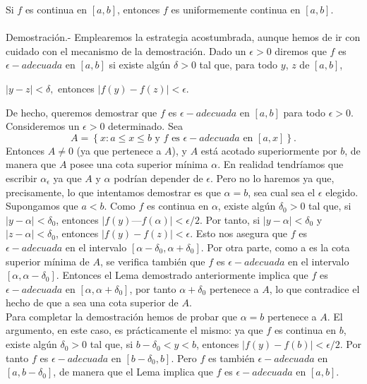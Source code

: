 \begin{teo}
    Si $f$ es continua en $[a,b]$, entonces $f$ es uniformemente continua en $[a,b]$.\\\\
	Demostración.-\; Emplearemos la estrategia acostumbrada, aunque hemos de ir con cuidado con el mecanismo de la demostración. Dado un $\epsilon>0$ diremos que $f$ es $\epsilon-adecuada$ en $[a,b]$ si existe algún $\delta>0$ tal que, para todo $y$,  $z$ de $[a,b]$,
	\begin{center}
	    $|y-z|<\delta,$ entonces $|f(y)-f(z)|<\epsilon.$
	\end{center}
	De hecho, queremos demostrar que $f$ es $\epsilon-adecuada$ en $[a,b]$ para todo $\epsilon>0.$\\
	Consideremos un $\epsilon>0$ determinado. Sea
	$$A=\left\{x:a\leq x \leq b \mbox{ y } f \mbox{ es } \epsilon-adecuada \mbox{ en } [a,x]\right\}.$$
	Entonces $A\neq 0$ (ya que pertenece a $A$), y $A$ está acotado superiormente por $b$, de manera que $A$ posee una cota superior mínima $\alpha$. En realidad tendríamos que escribir $\alpha_\epsilon$ ya que $A$ y $\alpha$ podrían depender de $\epsilon$. Pero no lo haremos ya que, precisamente, lo que intentamos demostrar es que $\alpha=b$, sea cual sea el $\epsilon$ elegido.\\
	Supongamos que $a < b$. Como $f$ es continua en $\alpha$, existe algún $\delta_0 > 0$ tal que, si $|y - \alpha| < \delta_0$, entonces $|f(y) — f(\alpha)| < \epsilon/2$. Por tanto, si $|y - \alpha| < \delta_0$ y $|z - \alpha| < \delta_0$, entonces $|f(y) - f(z)| < \epsilon$. Esto nos asegura que $f$ es $\epsilon-adecuada$ en el intervalo $[\alpha - \delta_0, \alpha + \delta_0]$. Por otra parte, como a es la cota superior mínima de $A$, se verifica también que $f$ es $\epsilon-adecuada$ en el intervalo $[\alpha, \alpha - \delta_0]$. Entonces el Lema demostrado anteriormente implica que $f$ es $\epsilon-adecuada$ en $[\alpha, \alpha + \delta_0]$, por tanto $\alpha + \delta_0$ pertenece a $A$, lo que contradice el hecho de que a sea una cota superior de $A$.\\
	Para completar la demostración hemos de probar que $\alpha = b$ pertenece a $A$. El argumento, en este caso, es prácticamente el mismo: ya que $f$ es continua en $b$, existe algún $\delta_0 > 0$ tal que, si $b - \delta_0 < y < b$, entonces $|f(y) - f(b)| < \epsilon/2$. Por tanto $f$ es $\epsilon-adecuada$ en $[b - \delta_0, b]$. Pero $f$ es también $\epsilon-adecuada$ en $[a, b - \delta_0]$, de manera que el Lema implica que $f$ es $\epsilon-adecuada$ en $[a,b]$.\\\\
\end{teo}

